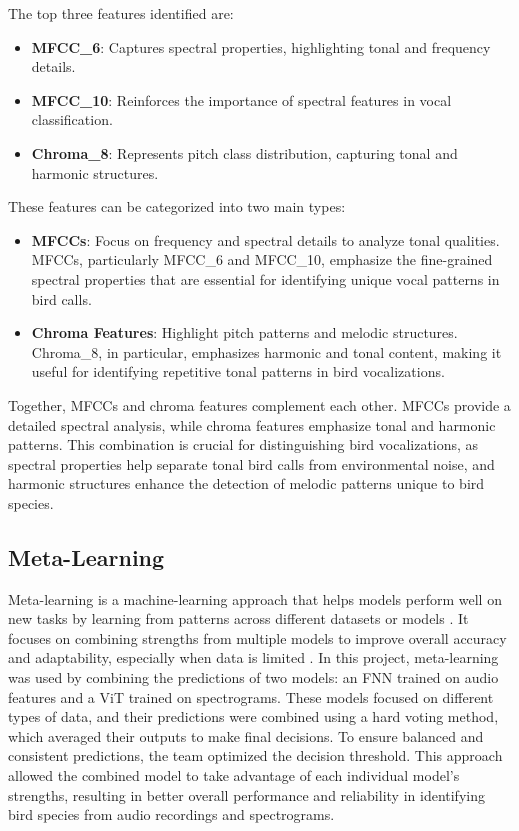 \documentclass[12pt, conference]{IEEEtran}
\begin{document}
The top three features identified are:
\begin{itemize}
    \item \textbf{MFCC\_6}: Captures spectral properties, highlighting tonal and frequency details.
    \item \textbf{MFCC\_10}: Reinforces the importance of spectral features in vocal classification.
    \item \textbf{Chroma\_8}: Represents pitch class distribution, capturing tonal and harmonic structures.
\end{itemize}

These features can be categorized into two main types:
\begin{itemize}
    \item \textbf{MFCCs}: Focus on frequency and spectral details to analyze tonal qualities. MFCCs, particularly MFCC\_6 and MFCC\_10, emphasize the fine-grained spectral properties that are essential for identifying unique vocal patterns in bird calls.
    \item \textbf{Chroma Features}: Highlight pitch patterns and melodic structures. Chroma\_8, in particular, emphasizes harmonic and tonal content, making it useful for identifying repetitive tonal patterns in bird vocalizations.
\end{itemize}

Together, MFCCs and chroma features complement each other. MFCCs provide a detailed spectral analysis, while chroma features emphasize tonal and harmonic patterns. This combination is crucial for distinguishing bird vocalizations, as spectral properties help separate tonal bird calls from environmental noise, and harmonic structures enhance the detection of melodic patterns unique to bird species.


\subsection{Meta-Learning}
Meta-learning is a machine-learning approach that helps models perform well on new tasks by learning from patterns across different datasets or models \cite{meta}. It focuses on combining strengths from multiple models to improve overall accuracy and adaptability, especially when data is limited \cite{meta}. In this project, meta-learning was used by combining the predictions of two models: an FNN trained on audio features and a ViT trained on spectrograms. These models focused on different types of data, and their predictions were combined using a hard voting method, which averaged their outputs to make final decisions. To ensure balanced and consistent predictions, the team optimized the decision threshold. This approach allowed the combined model to take advantage of each individual model's strengths, resulting in better overall performance and reliability in identifying bird species from audio recordings and spectrograms. 
\end{document}
